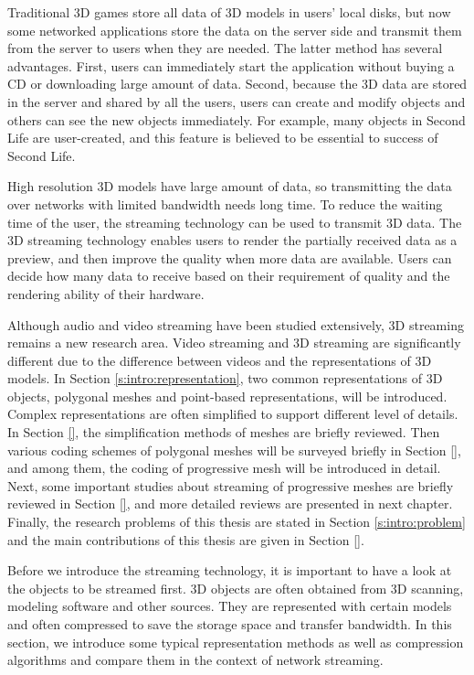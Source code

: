 \documentclass[11pt, a4paper]{report}
\begin{document}
    Traditional 3D games store all data of 3D models in users’ local disks, 
    but now some networked applications store the data on the server side 
    and transmit them from the server to users when they are needed. 
    The latter method has several advantages. 
    First, users can immediately start the application without buying a CD
    or downloading large amount of data. 
    Second, because the 3D data are stored in the server and shared by all the users, 
    users can create and modify objects and others can see the new objects immediately. 
    For example, many objects in Second Life are user-created, 
    and this feature is believed to be essential to success of Second Life. 

    High resolution 3D models have large amount of data, 
    so transmitting the data over networks with limited bandwidth needs long time. 
    To reduce the waiting time of the user, 
    the streaming technology can be used to transmit 3D data. 
    The 3D streaming technology enables users to render the partially received data as a preview, 
    and then improve the quality when more data are available. 
    Users can decide how many data to receive based on their requirement of quality
    and the rendering ability of their hardware. 

    Although audio and video streaming have been studied extensively, 
    3D streaming remains a new research area. 
    Video streaming and 3D streaming are significantly different
    due to the difference between videos and the representations of 3D models. 
    In Section \ref{s:intro:representation}, two common representations of 3D objects, 
    polygonal meshes and point-based representations, will be introduced. 
    Complex representations are often simplified to support different level of details. 
    In Section \ref{}, the simplification methods of meshes are briefly reviewed. 
    Then various coding schemes of polygonal meshes will be surveyed briefly in Section \ref{}, 
    and among them, the coding of progressive mesh will be introduced in detail. 
    Next, some important studies about streaming of progressive meshes
    are briefly reviewed in Section \ref{}, and more detailed reviews are presented in next chapter.
    Finally, the research problems of this thesis are stated in Section \ref{s:intro:problem}
    and the main contributions of this thesis are given in Section \ref{}.

    Before we introduce the streaming technology, it is important to
    have a look at the objects to be streamed first. 3D objects are
    often obtained from 3D scanning, modeling software and other
    sources. They are represented with certain models and often
    compressed to save the storage space and transfer bandwidth. In this
    section, we introduce some typical representation methods as well as 
    compression algorithms and compare them in the context of network streaming.
\end{document}
